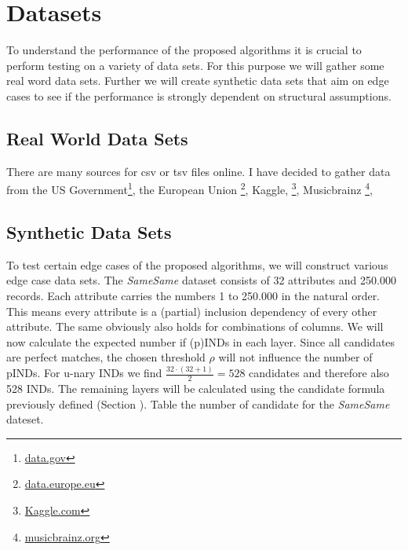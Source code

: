 \chapter{Datasets}
To understand the performance of the proposed algorithms it is crucial to perform testing on a variety of data sets. For this purpose we will gather some real word data sets. Further we will create synthetic data sets that aim on edge cases to see if the performance is strongly dependent on structural assumptions.

\section{Real World Data Sets}
There are many sources for csv or tsv files online. I have decided to gather data from the US Government\footnote{\href{https://data.gov}{data.gov}}, the European Union \footnote{\href{https://data.europe.eu}{data.europe.eu}}, Kaggle, \footnote{\href{https://kaggle.com}{Kaggle.com}}, Musicbrainz \footnote{\href{https://musicbrainz.org/}{musicbrainz.org}}, 


\section{Synthetic Data Sets}
To test certain edge cases of the proposed algorithms, we will construct various edge case data sets. The \textit{SameSame} dataset consists of 32 attributes and 250.000 records. Each attribute carries the numbers 1 to 250.000 in the natural order. This means every attribute is a (partial) inclusion dependency of every other attribute. The same obviously also holds for combinations of columns. We will now calculate the expected number if (p)INDs in each layer. Since all candidates are perfect matches, the chosen threshold $\rho$ will not influence the number of pINDs. For u-nary INDs we find
$\frac{32 \cdot (32 + 1)}{2} = 528$ candidates and therefore also 528 INDs. The remaining layers will be calculated using the candidate formula previously defined (Section %
). Table %
 the number of candidate for the \textit{SameSame} dateset.

